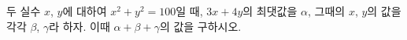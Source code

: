두 실수 $x$, $y$에 대하여 $x^2+y^2=100$일 때, $3x+4y$의 최댓값을 $\alpha$, 그때의 $x$, $y$의 값을 각각 $\beta$, $\gamma$라 하자. 이때 $\alpha+\beta+\gamma$의 값을 구하시오.

